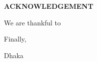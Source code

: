 \begin{center}
  \textbf{{\Large ACKNOWLEDGEMENT}}\\[60pt]
\end{center}

We are thankful to 


Finally,

\vspace*{20.0mm}

\begin{minipage}[t]{0.2\textwidth}
  Dhaka\par
  \thesisdate
\end{minipage}%
\hfill
\begin{minipage}[t]{0.45\textwidth}
  \begin{enumerate}
    \vspace{-0.75\baselineskip}
  \end{enumerate}
\end{minipage}

\endinput
